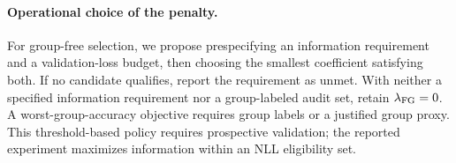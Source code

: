 \paragraph{Operational choice of the penalty.}
For group-free selection, we propose prespecifying an information requirement and a validation-loss budget, then choosing the smallest coefficient satisfying both. If no candidate qualifies, report the requirement as unmet. With neither a specified information requirement nor a group-labeled audit set, retain $\lambda_{\mathrm{FG}}=0$. A worst-group-accuracy objective requires group labels or a justified group proxy. This threshold-based policy requires prospective validation; the reported experiment maximizes information within an NLL eligibility set.
